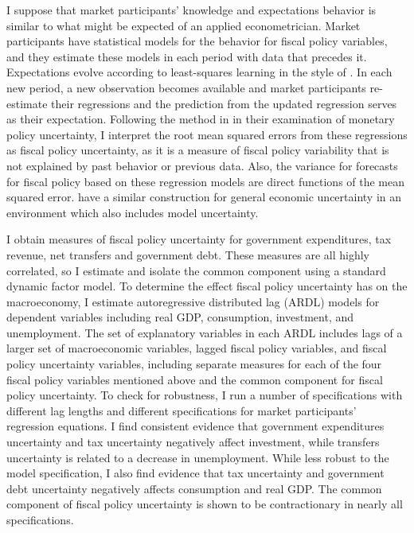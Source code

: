 \documentclass[11pt]{article}
\newcommand{\citee}[1]{\citet{#1}}
\begin{document}
I suppose that market participants' knowledge and expectations behavior is similar to what might be expected of an applied econometrician.  Market participants have statistical models for the behavior for fiscal policy variables, and they estimate these models in each period with data that precedes it.  Expectations evolve according to least-squares learning in the style of \citee{eh2001}.  In each new period, a new observation becomes available and market participants re-estimate their regressions and the prediction from the updated regression serves as their expectation.  Following the method in \citee{herromurray} in their examination of monetary policy uncertainty, I interpret the root mean squared errors from these regressions as fiscal policy uncertainty, as it is a measure of fiscal policy variability that is not explained by past behavior or previous data.  Also, the variance for forecasts for fiscal policy based on these regression models are direct functions of the mean squared error.  \citee{orlik2013} have a similar construction for general economic uncertainty in an environment which also includes model uncertainty.  

I obtain measures of fiscal policy uncertainty for government expenditures, tax revenue, net transfers and government debt.  These measures are all highly correlated, so I estimate and isolate the common component using a standard dynamic factor model.  To determine the effect fiscal policy uncertainty has on the macroeconomy, I estimate autoregressive distributed lag (ARDL) models for dependent variables including real GDP, consumption, investment, and unemployment.  The set of explanatory variables in each ARDL includes lags of a larger set of macroeconomic variables, lagged fiscal policy variables, and fiscal policy uncertainty variables, including separate measures for each of the four fiscal policy variables mentioned above and the common component for fiscal policy uncertainty.  To check for robustness, I run a number of specifications with different lag lengths and different specifications for market participants' regression equations.  I find consistent evidence that government expenditures uncertainty and tax uncertainty negatively affect investment, while transfers uncertainty is related to a decrease in unemployment.  While less robust to the model specification, I also find evidence that tax uncertainty and government debt uncertainty negatively affects consumption and real GDP.  The common component of fiscal policy uncertainty is shown to be contractionary in nearly all specifications.
\end{document}
